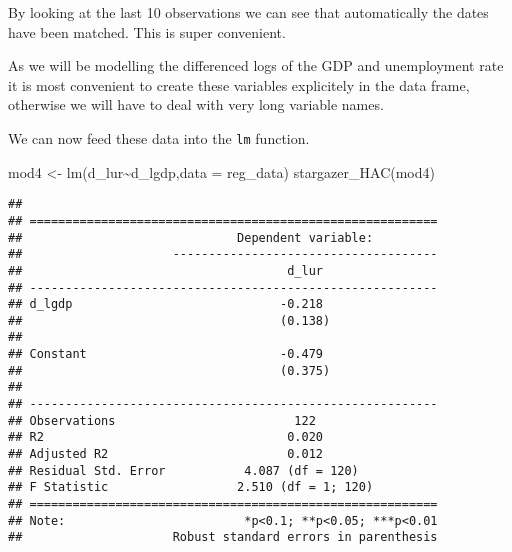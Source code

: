 \documentclass[
]{article}
\newenvironment{Shaded}{\begin{snugshade}}{\end{snugshade}}
\newcommand{\AttributeTok}[1]{\textcolor[rgb]{0.77,0.63,0.00}{#1}}
\newcommand{\CommentTok}[1]{\textcolor[rgb]{0.56,0.35,0.01}{\textit{#1}}}
\newcommand{\DecValTok}[1]{\textcolor[rgb]{0.00,0.00,0.81}{#1}}
\newcommand{\FunctionTok}[1]{\textcolor[rgb]{0.00,0.00,0.00}{#1}}
\newcommand{\NormalTok}[1]{#1}
\newcommand{\OtherTok}[1]{\textcolor[rgb]{0.56,0.35,0.01}{#1}}
\newcommand{\SpecialCharTok}[1]{\textcolor[rgb]{0.00,0.00,0.00}{#1}}
\begin{document}
By looking at the last 10 observations we can see that automatically the
dates have been matched. This is super convenient.

As we will be modelling the differenced logs of the GDP and unemployment
rate it is most convenient to create these variables explicitely in the
data frame, otherwise we will have to deal with very long variable
names.

\begin{Shaded}
\end{Shaded}

We can now feed these data into the \texttt{lm} function.

\begin{Shaded}
\begin{Highlighting}[]
\NormalTok{mod4 }\OtherTok{\textless{}{-}} \FunctionTok{lm}\NormalTok{(d\_lur}\SpecialCharTok{\textasciitilde{}}\NormalTok{d\_lgdp,}\AttributeTok{data =}\NormalTok{ reg\_data)}
\FunctionTok{stargazer\_HAC}\NormalTok{(mod4)}
\end{Highlighting}
\end{Shaded}

\begin{verbatim}
## 
## =========================================================
##                              Dependent variable:         
##                     -------------------------------------
##                                     d_lur                
## ---------------------------------------------------------
## d_lgdp                             -0.218                
##                                    (0.138)               
##                                                          
## Constant                           -0.479                
##                                    (0.375)               
##                                                          
## ---------------------------------------------------------
## Observations                         122                 
## R2                                  0.020                
## Adjusted R2                         0.012                
## Residual Std. Error           4.087 (df = 120)           
## F Statistic                  2.510 (df = 1; 120)         
## =========================================================
## Note:                         *p<0.1; **p<0.05; ***p<0.01
##                     Robust standard errors in parenthesis
\end{verbatim}
\end{document}
